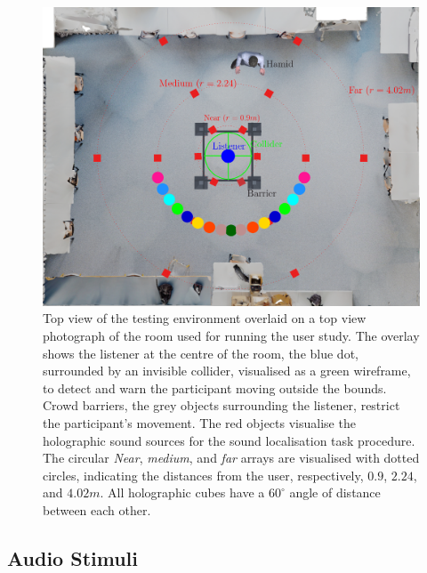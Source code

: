 \begin{figure}[htbp]
    \centering
    \includegraphics[width=1\linewidth]{7_evaluation/images/cst208topview-diagram2.png}
    \caption{Top view of the testing environment overlaid on a top view photograph of the room used for running the user study. The overlay shows the listener at the centre of the room, the blue dot, surrounded by an invisible collider, visualised as a green wireframe, to detect and warn the participant moving outside the bounds. Crowd barriers, the grey objects surrounding the listener, restrict the participant's movement. The red objects visualise the holographic sound sources for the sound localisation task procedure. The circular \emph{Near}, \emph{medium}, and \emph{far} arrays are visualised with dotted circles, indicating the distances from the user, respectively, $0.9$, $2.24$, and $4.02m$. All holographic cubes have a $60^\circ$ angle of distance between each other.}
    \label{fig:psycho-top-view}
\end{figure}
\subsection{Audio Stimuli}

